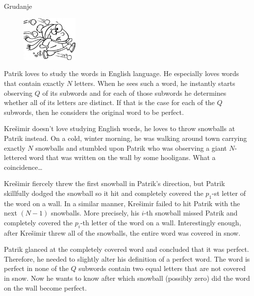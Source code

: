 \begin{statement}[
  problempoints=70,
  timelimit=2 seconds,
  memorylimit=512 MiB,
]{Grudanje}

\setlength\intextsep{-0.1cm}
\begin{figure}
\centering
\includegraphics[width=0.25\textwidth]{img/gruda.png}
\end{figure}


Patrik loves to study the words in English language. He especially loves words
that contain exactly $N$ letters. When he sees such a word, he instantly starts
observing $Q$ of its subwords and for each of those subwords he determines
whether all of its letters are distinct. If that is the case for each of the
$Q$ subwords, then he considers the original word to be perfect.

  Krešimir doesn't love studying English words, he loves to throw snowballs at
Patrik instead. On a cold, winter morning, he was walking around town
carrying exactly $N$ snowballs and stumbled upon Patrik who was observing a
giant $N$-lettered word that was written on the wall by some hooligans.  What
a coincidence\dots

Krešimir fiercely threw the first snowball in Patrik's direction, but Patrik
skillfully dodged the snowball so it hit and completely
covered the $p_1$-st letter of the word on a wall. In a similar manner,
Krešimir failed to hit Patrik with the next $(N-1)$ snowballs. More precisely,
his $i$-th snowball missed Patrik and completely covered the $p_i$-th letter
of the word on a wall. Interestingly enough, after Krešimir threw all of the
snowballs, the entire word was covered in snow.

Patrik glanced at the completely covered word and concluded that it was perfect.
Therefore, he needed to slightly alter his definition of a perfect word. The
word is perfect in none of the $Q$ subwords contain two equal letters that are
not covered in snow. Now he wants to know after which snowball (possibly
zero) did the word on the wall become perfect.


\end{statement}
